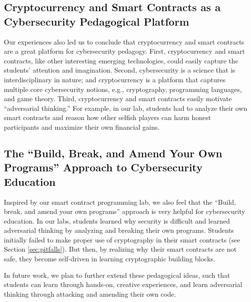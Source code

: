 \documentclass{llncs}
\newcommand{\ignore}[1]{}
\begin{document}
\subsection{Cryptocurrency and Smart Contracts as 
a Cybersecurity Pedagogical Platform}
Our experiences also led us to conclude 
that cryptocurrency and smart contracts are a
great platform for cybersecurity pedagogy. 
First, cryptocurrency and smart contracts, like
other interesting emerging technologies, could easily capture the students'
attention and imagination.
Second, 
cybersecurity is a science that is interdisciplinary in nature;
and cryptocurrency is a platform that captures 
multiple core cybersecurity notions, e.g., cryptography, 
programming languages, and game theory. 
Third, cryptocurrency and smart contracts
easily motivate ``adversarial thinking.'' For example,
in our lab, students had to analyze their own smart contracts
and reason how other selfish players can harm 
honest participants and maximize their own financial gains.

\ignore{
in our lab, students were able to compose smart contracts,
and then conduct in-depth security analyses of their own smart contracts.
In this process, students learned the 
essence of ``adversarial thinking'', e.g., by reasoning how
selfish participants in a smart contract 
can maximize its financial gains and harm honest players. 
}


\subsection{The ``Build, Break, and Amend Your Own Programs''
Approach to Cybersecurity Education}
Inspired by our smart contract programming lab, 
we also feel that the 
``Build, break, and amend your own programs'' approach
is very helpful for cybersecurity education. 
In our labs, students learned why security is difficult 
and learned adversarial thinking
by analyzing and breaking 
their own programs.  
Students initially  
failed to make proper use of cryptography in their 
smart contracts (see Section \ref{sec:pitfalls}).
But then, by realizing
why their smart contracts are not safe, they 
become self-driven in learning cryptographic building blocks.

In future work, we plan to further extend these pedagogical ideas, 
such that students can learn through hands-on, 
creative experiences, and learn adversarial thinking 
through attacking and amending their own code.
\end{document}
